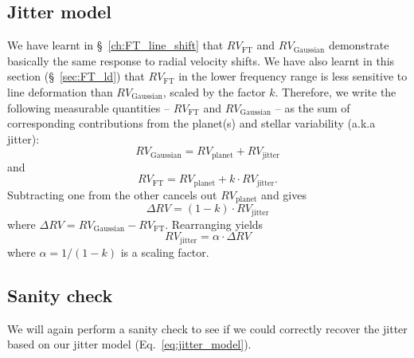 \subsection{Jitter model}

We have learnt in \S~\ref{ch:FT_line_shift} that $RV_\text{FT}$ and $RV_\text{Gaussian}$
demonstrate basically the same response to radial velocity shifts. 
We have also learnt in this section (\S~\ref{sec:FT_ld}) that $RV_\text{FT}$ in the lower frequency range
is less sensitive to line deformation than $RV_\text{Gaussian}$, scaled by the factor $k$. 
Therefore, we write the following measurable quantities -- $RV_\text{FT}$ and $RV_\text{Gaussian}$ --
as the sum of corresponding contributions from the planet(s) and stellar variability (a.k.a jitter):
\begin{equation}
	RV_\text{Gaussian} = RV_\text{planet} + RV_\text{jitter}
\label{eq:RV_Gaussian}
\end{equation}
and
\begin{equation}
	RV_\text{FT} = RV_\text{planet} + k \cdot RV_\text{jitter}. 
\label{eq:RV_FT}
\end{equation}
Subtracting one from the other cancels out $RV_\text{planet}$ and gives
\begin{equation}
	\Delta RV = (1-k) \cdot RV_\text{jitter}
\end{equation}
where $\Delta RV = RV_\text{Gaussian} - RV_\text{FT}$. Rearranging yields 
\begin{equation}
	RV_\text{jitter} = \alpha \cdot \Delta RV
\label{eq:jitter_model}
\end{equation}
where $\alpha = 1/(1-k)$ is a scaling factor.  


\subsection{Sanity check}
\label{sec:check}

We will again perform a sanity check to see if we could correctly recover the jitter
based on our jitter model (Eq.~\ref{eq:jitter_model}). 

